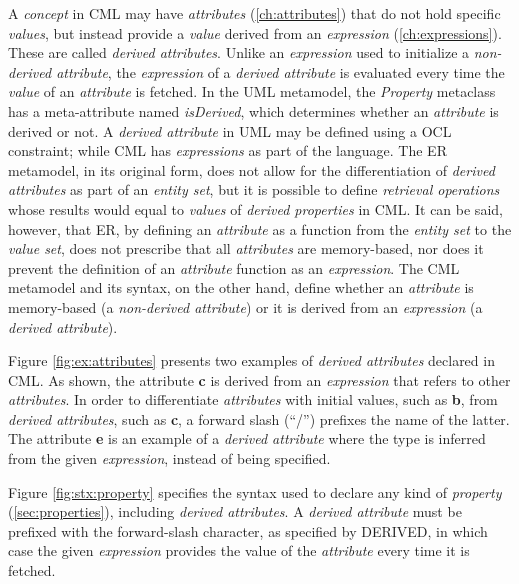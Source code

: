 \begin{definition}
A \emph{concept} in CML may have \emph{attributes} (\ref{ch:attributes})
that do not hold specific \emph{values},
but instead provide a \emph{value} derived from an \emph{expression} (\ref{ch:expressions}).
These are called \emph{derived attributes}.
Unlike an \emph{expression} used to initialize a \emph{non-derived attribute},
the \emph{expression} of a \emph{derived attribute} is evaluated
every time the \emph{value} of an \emph{attribute} is fetched.
In the UML \cite{uml} metamodel,
the \emph{Property} metaclass has a meta-attribute named \emph{isDerived},
which determines whether an \emph{attribute} is derived or not.
A \emph{derived attribute} in UML may be defined using a OCL \cite{ocl} constraint;
while CML has \emph{expressions} as part of the language.
The ER \cite{er} metamodel,
in its original form,
does not allow for the differentiation of \emph{derived attributes}
as part of an \emph{entity set},
but it is possible to define \emph{retrieval operations} whose 
results would equal to \emph{values} of \emph{derived properties} in CML.
It can be said, however, that ER,
by defining an \emph{attribute} as a function from the \emph{entity set}
to the \emph{value set},
does not prescribe that all \emph{attributes} are memory-based,
nor does it prevent the definition of an \emph{attribute} function 
as an \emph{expression}.
The CML metamodel and its syntax, on the other hand,
define whether an \emph{attribute} is memory-based (a \emph{non-derived attribute})
or it is derived from an \emph{expression} (a \emph{derived attribute}).
\end{definition}

\begin{examples}
Figure \ref{fig:ex:attributes} presents two examples of \emph{derived attributes}
declared in CML.
As shown,
the attribute \textbf{c} is derived from an \emph{expression}
that refers to other \emph{attributes}.
In order to differentiate \emph{attributes} with initial values,
such as \textbf{b},
from \emph{derived attributes},
such as \textbf{c},
a forward slash (``/'') prefixes the name of the latter.
The attribute \textbf{e} is an example of a \emph{derived attribute}
where the type is inferred from the given \emph{expression},
instead of being specified.
\end{examples}

\begin{concrete-syntax}
Figure \ref{fig:stx:property} specifies the syntax used
to declare any kind of \emph{property} (\ref{sec:properties}),
including \emph{derived attributes}.
A \emph{derived attribute} must be prefixed with the forward-slash character,
as specified by DERIVED,
in which case the given \emph{expression} provides the value
of the \emph{attribute} every time it is fetched.
\end{concrete-syntax}
